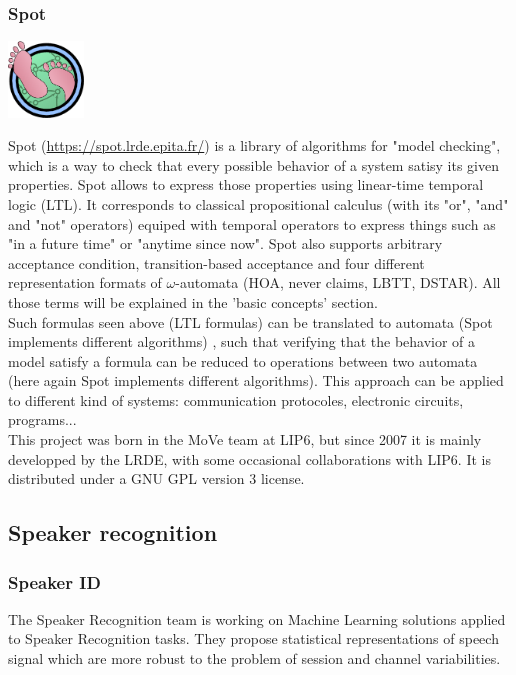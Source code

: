 \subsubsection{Spot}
\begin{center}
 \includegraphics[width=2cm]{img/spot.png}
\end{center}
Spot (\url{https://spot.lrde.epita.fr/}) is a library of algorithms for "model checking",
which is a way to check that every possible behavior of a system satisy its given properties.
Spot allows to express those properties using linear-time temporal logic (LTL). It corresponds to classical
propositional calculus (with its "or", "and" and "not" operators) equiped with temporal operators to
express things such as "in a future time" or "anytime since now". Spot also supports arbitrary 
acceptance condition, transition-based acceptance and four different representation formats of
$\omega$-automata (HOA, never claims, LBTT, DSTAR). All those terms will be explained in the 'basic
concepts' section.\\

Such formulas seen above (LTL formulas) can be translated to automata (Spot implements different algorithms)
, such that verifying that the behavior of a model satisfy a formula can be reduced to operations between
two automata (here again Spot implements different algorithms). This approach can be applied to different kind of systems: communication protocoles,
electronic circuits, programs...\\

This project was born in the MoVe team at LIP6, but since 2007 it is mainly developped by the LRDE, with some
occasional collaborations with LIP6. It is distributed under a GNU GPL version 3 license. 


\subsection{Speaker recognition}
\subsubsection{Speaker ID}
The Speaker Recognition team is working on Machine Learning solutions applied to Speaker Recognition
tasks. They propose statistical representations of speech signal which are more robust to the problem
of session and channel variabilities.\\


